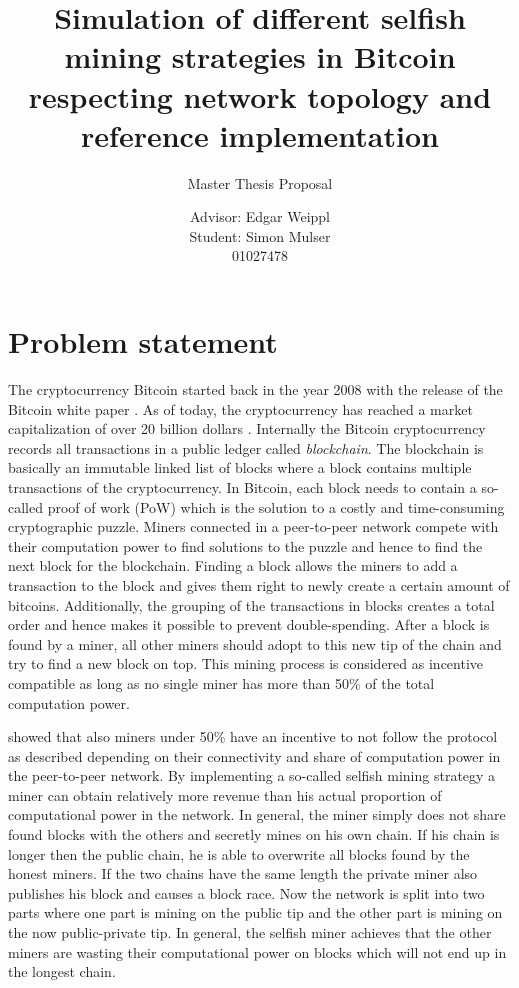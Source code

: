 \documentclass{scrartcl}
\title{Simulation of different selfish mining strategies in Bitcoin respecting network topology and reference implementation}
\subtitle{Master Thesis Proposal}
\author{Advisor: Edgar Weippl\\
		Student: Simon Mulser\\
		01027478}
\begin{document}
\maketitle

\section{Problem statement}
The cryptocurrency Bitcoin started back in the year 2008 with the release of the Bitcoin white paper \cite{nakamoto2008bitcoin}.
As of today, the cryptocurrency has reached a market capitalization of over 20 billion dollars \cite{marketcap2017}.
Internally the Bitcoin cryptocurrency records all transactions in a public ledger called \emph{blockchain}.
The blockchain is basically an immutable linked list of blocks where a block contains multiple transactions of the cryptocurrency.
In Bitcoin, each block needs to contain a so-called proof of work (PoW) which is the solution to a costly and time-consuming cryptographic puzzle.
Miners connected in a peer-to-peer network compete with their computation power to find solutions to the puzzle and hence to find the next block for the blockchain.
Finding a block allows the miners to add a transaction to the block and gives them right to newly create a certain amount of bitcoins.
Additionally, the grouping of the transactions in blocks creates a total order and hence makes it possible to prevent double-spending.
After a block is found by a miner, all other miners should adopt to this new tip of the chain and try to find a new block on top.
This mining process is considered as incentive compatible as long as no single miner has more than 50\% of the total computation power.

\citeauthor{eyal2014majority} showed that also miners under 50\% have an incentive to not follow the protocol as described depending on their connectivity and share of computation power in the peer-to-peer network.
By implementing a so-called selfish mining strategy a miner can obtain relatively more revenue than his actual proportion of computational power in the network.
In general, the miner simply does not share found blocks with the others and secretly mines on his own chain.
If his chain is longer then the public chain, he is able to overwrite all blocks found by the honest miners.
If the two chains have the same length the private miner also publishes his block and causes a block race.
Now the network is split into two parts where one part is mining on the public tip and the other part is mining on the now public-private tip.
In general, the selfish miner achieves that the other miners are wasting their computational power on blocks which will not end up in the longest chain.
\end{document}
